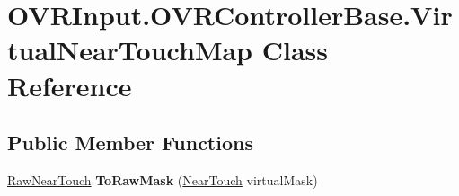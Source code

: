 \hypertarget{class_o_v_r_input_1_1_o_v_r_controller_base_1_1_virtual_near_touch_map}{}\section{O\+V\+R\+Input.\+O\+V\+R\+Controller\+Base.\+Virtual\+Near\+Touch\+Map Class Reference}
\label{class_o_v_r_input_1_1_o_v_r_controller_base_1_1_virtual_near_touch_map}
\subsection*{Public Member Functions}
\begin{DoxyCompactItemize}
\item 
\mbox{\label{class_o_v_r_input_1_1_o_v_r_controller_base_1_1_virtual_near_touch_map_ac00d3d1bf2e9a903fde730fee252c703}} 
\mbox{\hyperlink{class_o_v_r_input_ac9c3c10aa9911507c6dc66e2dd6ec60e}{Raw\+Near\+Touch}} {\bfseries To\+Raw\+Mask} (\mbox{\hyperlink{class_o_v_r_input_afa31aa573064be9bab8fc9e58cddeab6}{Near\+Touch}} virtual\+Mask)
\end{DoxyCompactItemize}
